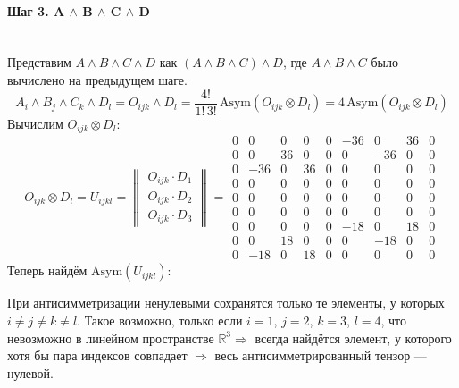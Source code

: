 \documentclass{article}
\begin{document}
\paragraph*{Шаг 3. A $\wedge$ B $\wedge$ C $\wedge$ D} \, \\
Представим $A \wedge B \wedge C \wedge D$ как $(A \wedge B \wedge C) \wedge D$, где $A \wedge B \wedge C$ было вычислено на предыдущем шаге.
$$A_i \wedge B_j \wedge C_k \wedge D_l = O_{ijk} \wedge D_l = \dfrac{4!}{1!\,3!}\,\text{Asym}(O_{ijk}\otimes D_l) = 4\,\text{Asym}(O_{ijk}\otimes D_l)$$
Вычислим $O_{ijk}\otimes D_l$:
$$O_{ijk}\otimes D_l = U_{ijkl} = \begin{Vmatrix}
O_{ijk} \cdot D_1 \\
\hline
O_{ijk} \cdot D_2 \\
\hline
O_{ijk} \cdot D_3
\end{Vmatrix} = \begin{array}{||ccc|ccc|ccc||}
0 & 0 & 0 & 0 & 0 & -36 & 0 & 36 & 0 \\
0 & 0 & 36 & 0 & 0 & 0 & -36 & 0 & 0 \\
0 & -36 & 0 & 36 & 0 & 0 & 0 & 0 & 0 \\
\hline
0 & 0 & 0 & 0 & 0 & 0 & 0 & 0 & 0 \\
0 & 0 & 0 & 0 & 0 & 0 & 0 & 0 & 0 \\
0 & 0 & 0 & 0 & 0 & 0 & 0 & 0 & 0 \\
\hline
0 & 0 & 0 & 0 & 0 & -18 & 0 & 18 & 0 \\
0 & 0 & 18 & 0 & 0 & 0 & -18 & 0 & 0 \\
0 & -18 & 0 & 18 & 0 & 0 & 0 & 0 & 0
\end{array}$$
\pagebreak
Теперь найдём $\text{Asym}(U_{ijkl})$:
\begin{center}
При антисимметризации ненулевыми сохранятся только те элементы, у которых $i \neq j \neq k \neq l$. Такое возможно, только если $i = 1$, $j = 2$, $k = 3$, $l = 4$, что невозможно в линейном пространстве $\mathbb{R}^{3} \Rightarrow$ всегда найдётся элемент, у которого хотя бы пара индексов совпадает $\Rightarrow$ весь антисимметрированный тензор --- нулевой.
\end{center}
\end{document}
